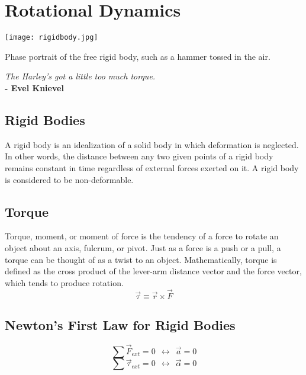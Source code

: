 \chapter{Rotational Dynamics}

\begin{marginfigure}%
  \texttt{[image: rigidbody.jpg]}
  \caption{Phase portrait of the free rigid body, such as a hammer tossed in the air.}
  \label{fig:marginfig}
\end{marginfigure}


\textit{The Harley's got a little too much torque.}  \\
\noindent\textbf{-   Evel Knievel}


 \section{Rigid Bodies}
 A rigid body is an idealization of a solid body in which deformation is neglected. In other words, the distance between any two given points of a rigid body remains constant in time regardless of external forces exerted on it.  A rigid body is considered to be non-deformable.
 
 
 
 \section{Torque}
 Torque, moment, or moment of force is the tendency of a force to rotate an object about an axis, fulcrum, or pivot. Just as a force is a push or a pull, a torque can be thought of as a twist to an object. Mathematically, torque is defined as the cross product of the lever-arm distance vector and the force vector, which tends to produce rotation.
  $$\overrightarrow{\tau}\equiv \overrightarrow{r}\times  \overrightarrow{F}$$

\section{Newton's First Law for Rigid Bodies}
$$\sum{ \overrightarrow{F}_{ext}}=0 \ \ \longleftrightarrow \ \ \overrightarrow{a}=0 $$
$$\sum{ \overrightarrow{\tau}_{ext}}=0 \ \ \longleftrightarrow \ \ \overrightarrow{\alpha}=0$$ \ \ \ \ \ 


